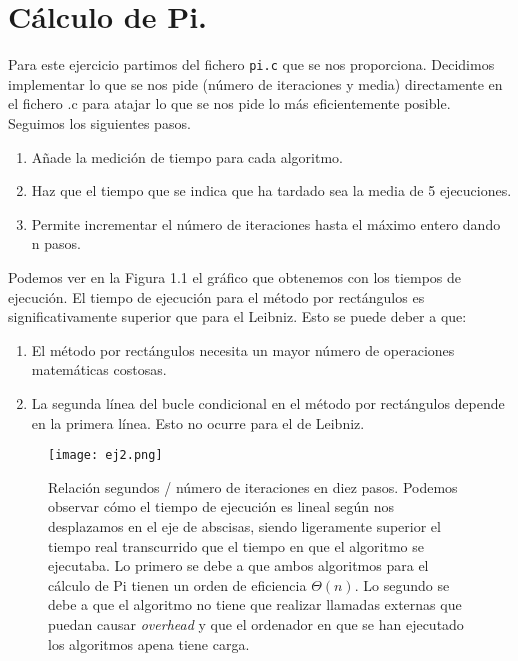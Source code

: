 \section{Cálculo de Pi.}

Para este ejercicio partimos del fichero \texttt{pi.c} que se nos proporciona. Decidimos
implementar lo que se nos pide (número de iteraciones y media) directamente en el fichero
.c para atajar lo que se nos pide lo más eficientemente posible. Seguimos los siguientes pasos.

\begin{enumerate}
    \item Añade la medición de tiempo para cada algoritmo.
    \item Haz que el tiempo que se indica que ha tardado sea la media de 5 ejecuciones.
    \item Permite incrementar el número de iteraciones hasta el máximo entero dando n pasos.
\end{enumerate}

Podemos ver en la Figura 1.1 el gráfico que obtenemos con los tiempos de ejecución. El tiempo de ejecución
para el método por rectángulos es significativamente superior que para el Leibniz. Esto se puede deber a que:
\begin{enumerate}
    \item El método por rectángulos necesita un mayor número de operaciones matemáticas costosas.
    \item La segunda línea del bucle condicional en el método por rectángulos depende en la primera línea. Esto no ocurre para el de Leibniz.
\end{enumerate}

\begin{figure}[ht]
    \centering
    \texttt{[image: ej2.png]}
    \caption{Relación segundos / número de iteraciones en diez pasos. Podemos observar cómo el
    tiempo de ejecución es lineal según nos desplazamos en el eje de abscisas, siendo ligeramente
    superior el tiempo real transcurrido que el tiempo en que el algoritmo se ejecutaba. Lo primero
    se debe a que ambos algoritmos para el cálculo de Pi tienen un orden de eficiencia $\Theta (n)$.
    Lo segundo se debe a que el algoritmo no tiene que realizar llamadas externas que puedan causar \textit{overhead} y que el ordenador en que se han ejecutado
    los algoritmos apena tiene carga. }
\end{figure}